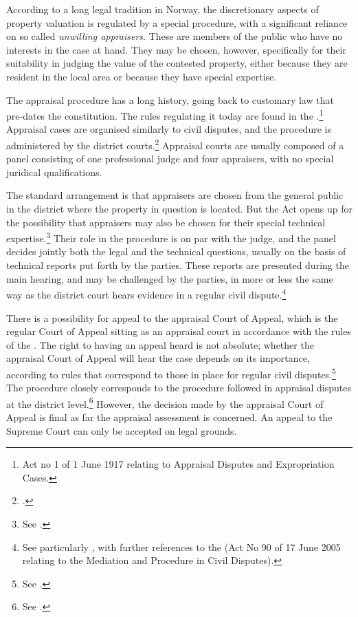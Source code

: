 According to a long legal tradition in Norway, the discretionary aspects of property valuation is regulated by a special procedure, with a significant reliance on so called \emph{unwilling appraisers}. These are members of the public who have no interests in the case at hand. They may be chosen, however,  specifically for their suitability in judging the value of the contested property, either because they are resident in the local area or because they have special expertise.

The appraisal procedure has a long history, going back to customary law that pre-dates the constitution. The rules regulating it today are found in the \cite{aa17}.\footnote{Act no 1 of 1 June 1917 relating to Appraisal Disputes and Expropriation Cases.} Appraisal cases are organised similarly to civil disputes, and the procedure is administered by the district courts.\footnote{\cite[5]{aa17}.} Appraisal courts are usually composed of a panel consisting of one professional judge and four appraisers, with no special juridical qualifications. 

The standard arrangement is that appraisers are chosen from the general public in the district where the property in question is located. But the Act opens up for the possibility that appraisers may also be chosen for their special technical expertise.\footnote{See \cite[11|12]{aa17}.} Their role in the procedure is on par with the judge, and the panel decides jointly both the legal and the technical questions, usually on the basis of technical reports put forth by the parties. These reports are presented during the main hearing, and may be challenged by the parties, in more or less the same way as the district court hears evidence in a regular civil dispute.\footnote{See particularly \cite[22|27]{aa17}, with further references to the \cite{da05} (Act No 90 of 17 June 2005 relating to the Mediation and Procedure in Civil Disputes).} 

There is a possibility for appeal to the appraisal Court of Appeal, which is the regular Court of Appeal sitting as an appraisal court in accordance with the rules of the \cite{aa17}. The right to having an appeal heard is not absolute; whether the appraisal Court of Appeal will hear the case depends on its importance, according to rules that correspond to those in place for regular civil disputes.\footnote{See \cite[32]{aa17}.} The procedure closely corresponds to the procedure followed in appraisal disputes at the district level.\footnote{See \cite[38]{aa17}.} However, the decision made by the appraisal Court of Appeal is final as far the appraisal assessment is concerned. An appeal to the Supreme Court can only be accepted on legal grounds.


